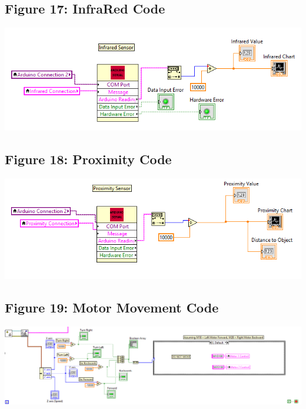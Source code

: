 \documentclass{article}
\begin{document}
\subsection{Figure 17: InfraRed Code}
\begin{center}{ \includegraphics[width=\textwidth]{InfraRedSensor.png}}\end{center}

\subsection{Figure 18: Proximity Code}
\begin{center}{ \includegraphics[width=\textwidth]{ProximitySensor.png}}\end{center}

\subsection{Figure 19: Motor Movement Code}
\begin{center}{ \includegraphics[width=\textwidth]{MotorMovement.png}}\end{center}
\end{document}
